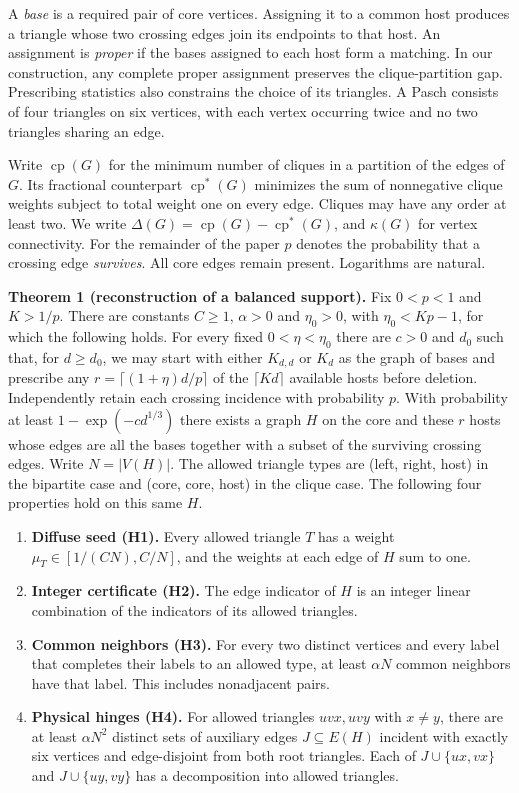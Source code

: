 \documentclass[english,11pt,a4paper]{article}
\providecommand{\tightlist}{\setlength{\itemsep}{0pt}\setlength{\parskip}{0pt}}
\begin{document}
A \emph{base} is a required pair of core vertices. Assigning it to a common host produces a triangle whose two crossing edges join its endpoints to that host. An assignment is \emph{proper} if the bases assigned to each host form a matching. In our construction, any complete proper assignment preserves the clique-partition gap. Prescribing statistics also constrains the choice of its triangles. A Pasch consists of four triangles on six vertices, with each vertex occurring twice and no two triangles sharing an edge.

Write \(\operatorname{cp}(G)\) for the minimum number of cliques in a partition of the edges of \(G\). Its fractional counterpart \(\operatorname{cp}^{\ast}(G)\) minimizes the sum of nonnegative clique weights subject to total weight one on every edge. Cliques may have any order at least two. We write \(\Delta(G)=\operatorname{cp}(G)-\operatorname{cp}^{\ast}(G)\), and \(\kappa(G)\) for vertex connectivity. For the remainder of the paper \(p\) denotes the probability that a crossing edge \emph{survives}. All core edges remain present. Logarithms are natural.

\textbf{Theorem 1 (reconstruction of a balanced support).} Fix \(0<p<1\) and \(K>1/p\). There are constants \(C\ge1\), \(\alpha>0\) and \(\eta_0>0\), with \(\eta_0<Kp-1\), for which the following holds. For every fixed \(0<\eta<\eta_0\) there are \(c>0\) and \(d_0\) such that, for \(d\ge d_0\), we may start with either \(K_{d,d}\) or \(K_d\) as the graph of bases and prescribe any \(r=\lceil(1+\eta)d/p\rceil\) of the \(\lceil Kd\rceil\) available hosts before deletion. Independently retain each crossing incidence with probability \(p\). With probability at least \(1-\exp(-c d^{1/3})\) there exists a graph \(H\) on the core and these \(r\) hosts whose edges are all the bases together with a subset of the surviving crossing edges. Write \(N=|V(H)|\). The allowed triangle types are (left, right, host) in the bipartite case and (core, core, host) in the clique case. The following four properties hold on this same \(H\).

\begin{enumerate}
\def\labelenumi{\arabic{enumi}.}
\tightlist
\item
  \textbf{Diffuse seed (H1).} Every allowed triangle \(T\) has a weight \(\mu_T\in[1/(CN),C/N]\), and the weights at each edge of \(H\) sum to one.
\item
  \textbf{Integer certificate (H2).} The edge indicator of \(H\) is an integer linear combination of the indicators of its allowed triangles.
\item
  \textbf{Common neighbors (H3).} For every two distinct vertices and every label that completes their labels to an allowed type, at least \(\alpha N\) common neighbors have that label. This includes nonadjacent pairs.
\item
  \textbf{Physical hinges (H4).} For allowed triangles \(uvx,uvy\) with \(x\ne y\), there are at least \(\alpha N^2\) distinct sets of auxiliary edges \(J\subseteq E(H)\) incident with exactly six vertices and edge-disjoint from both root triangles. Each of \(J\cup\{ux,vx\}\) and \(J\cup\{uy,vy\}\) has a decomposition into allowed triangles.
\end{enumerate}
\end{document}
